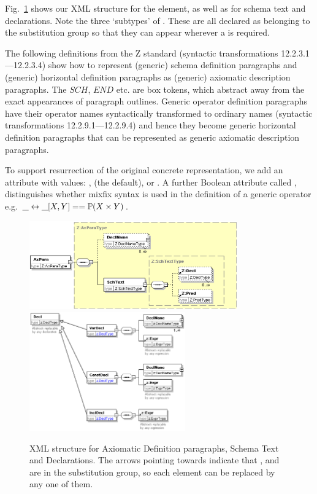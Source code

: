 \documentclass{llncs}  %
\begin{document}
Fig.~\ref{fig:axpara} shows our XML structure for the 
element, as well as for schema text and declarations.  Note the
three `subtypes' of .  These are all declared as belonging to
the  substitution group so that they can appear wherever
a  is required.

The following definitions from the Z standard
(syntactic transformations 12.2.3.1---12.2.3.4)
show how to represent (generic) schema definition paragraphs
and (generic) horizontal definition paragraphs
as (generic) axiomatic description paragraphs.  The $SCH$, $END$ {etc.} are
box tokens, which abstract away from the exact appearances of paragraph
outlines. 
\DTschemadef
\DTgenschemadef
\DThorizdef
\DTgenhorizdef
Generic operator definition paragraphs have their operator names
syntactically transformed to ordinary names
(syntactic transformations 12.2.9.1---12.2.9.4)
and hence they become generic horizontal definition paragraphs
that can be represented as generic axiomatic description paragraphs.

To support resurrection of the original concrete representation, we add an
attribute  with values: ,  (the
default), or .  A further Boolean attribute called
, distinguishes whether mixfix syntax is used in the 
definition of a generic operator
e.g. $\_ \rel \_ [X,Y] == \power(X \cross Y)$.

\begin{figure}[!htb]
  \centering
  \includegraphics[width=0.8\textwidth]{axpara.eps}
  \includegraphics[width=0.6\textwidth]{decls.eps}
  \caption{XML structure for Axiomatic Definition paragraphs, Schema Text
  and Declarations.  The arrows pointing towards  indicate that
  ,  and  are in the
   substitution group, so each  element can be
  replaced by any one of them.}
  \label{fig:axpara}
\end{figure}
\end{document}
